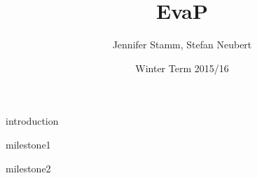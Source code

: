 \documentclass[12pt,a4paper]{scrartcl}
\title{EvaP}
\author{Jennifer Stamm, Stefan Neubert}
\date{Winter Term 2015/16}
\begin{document}
	\maketitle
	
	\tableofcontents
	
	\clearpage
	
	{introduction}

	{milestone1}
    
    {milestone2}
\end{document}
